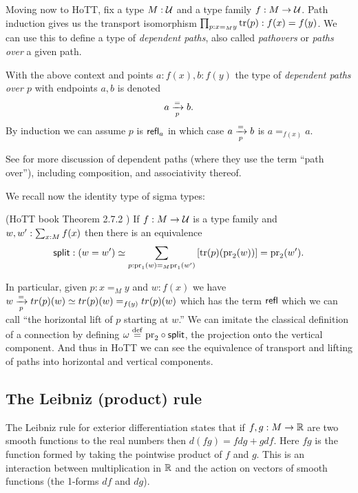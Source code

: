 \documentclass[12pt]{article}
\begin{document}
Moving now to HoTT, fix a type \( M:\mathcal{U} \) and a type family \( f:M\to\mathcal{U} \). Path induction gives us the transport isomorphism \( \prod_{p:x=_M y}\mathrm{tr}(p):f(x)=f(y) \). We can use this to define a type of \emph{dependent paths}, also called \emph{pathovers} or \emph{paths over} a given path.

\begin{mydef}
With the above context and points \( a:f(x), b:f(y) \) the type of \emph{dependent paths over \( p \)} with endpoints \( a, b \) is denoted
\[ a\xrightarrow[{p}]{=}b.
\]
By induction we can assume \( p \) is \( \mathsf{refl}_a \) in which case \( a\xrightarrow[{p}]{=}b \) is \( a=_{f(x)}a \).
\end{mydef}

See \cite{Symmetry} for more discussion of dependent paths (where they use the term ``path over''), including composition, and associativity thereof.

We recall now the identity type of sigma types:

\begin{mythm}\label{thm:idsit}
(HoTT book Theorem 2.7.2 \cite{hottbook}) If \( f:M\to \mathcal{U} \) is a type family and \( w,w':\sum_{x:M}f(x) \) then there is an equivalence 
\[ 
\mathsf{split}:(w=w')\simeq \sum_{p:\mathrm{pr}_1(w)=_M\mathrm{pr}_1(w')} \left[\mathrm{tr}(p)(\mathrm{pr}_2(w))\right] = \mathrm{pr}_2(w').
\]
\end{mythm}

In particular, given \( p:x=_M y \) and \( w:f(x) \) we have \( w\xrightarrow[{p}]{=}tr(p)(w)\simeq tr(p)(w)=_{f(y)}tr(p)(w) \) which has the term \( \mathsf{refl} \) which we can call ``the horizontal lift of \( p \) starting at \( w \).'' We can imitate the classical definition of a connection by defining \( \omega\stackrel{\mathrm{def}}{=} \mathrm{pr}_2\circ\mathsf{split} \), the projection onto the vertical component. And thus in HoTT we can see the equivalence of transport and lifting of paths into horizontal and vertical components.

\subsection{The Leibniz (product) rule}

The Leibniz rule for exterior differentiation states that if \( f, g:M\to \mathbb{R} \) are two smooth functions to the real numbers then \( d(fg) = fdg + gdf \). Here \( fg \) is the function formed by taking the pointwise product of \( f \) and \( g \). This is an interaction between multiplication in \( \mathbb{R} \) and the action on vectors of smooth functions (the 1-forms \( df \) and \( dg \)). 
\end{document}
